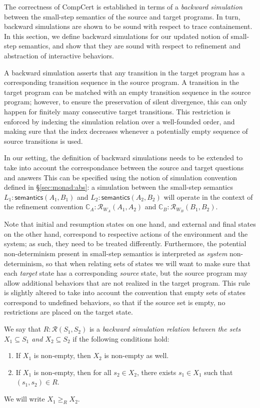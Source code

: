 \documentclass[acmsmall,timestamp,review]{acmart}
\newcommand{\kw}[1]{\ensuremath{ \mathsf{#1} }}
\begin{document}
The correctness of CompCert is established in terms of
a \emph{backward simulation}
between the small-step semantics of the source and target programs.
In turn, backward simulations
are shown to be sound with respect to trace containement.
In this section,
we define backward simulations for our updated notion
of small-step semantics,
and show that they are sound with respect to
refinement and abstraction of interactive behaviors.

A backward simulation asserts that any transition in the target program
has a corresponding transition sequence in the source program.
A transition in the target program can be matched with
an empty transition sequence in the source program;
however, to ensure the preservation of silent divergence,
this can only happen for finitely many consecutive target transitions.
This restriction is enforced by indexing the simulation relation
over a well-founded order,
and making sure that the index decreases
whenever a potentially empty sequence of source transitions is used.

In our setting,
the definition of backward simulations needs to be extended
to take into account the correspondance between
the source and target questions and answers
This can be specified using the notion of simulation convention
defined in \S\ref{sec:monad:abs}:
a simulation between the small-step semantics
$L_1 : \kw{semantics}(A_1, B_1)$ and
$L_2 : \kw{semantics}(A_2, B_2)$ will
operate in the context of the refinement convention
$\mathbb{C}_A : \mathcal{R}_{W_A}(A_1, A_2)$ and
$\mathbb{C}_B : \mathcal{R}_{W_B}(B_1, B_2)$.

Note that initial and resumption states on one hand,
and external and final states on the other hand,
correspond to respective actions of the environment and the system;
as such, they need to be treated differently.
Furthermore,
the potential non-determinism present in small-step semantics
is interpreted as \emph{system} non-determinism,
so that when relating sets of states
we will want to make sure that
each \emph{target} state has a corresponding \emph{source} state,
but the source program may allow additional behaviors
that are not realized in the target program.
This rule is slightly altered to take into account the convention that
empty sets of states correspond to undefined behaviors,
so that if the source set is empty,
no restrictions are placed on the target state.

\begin{definition}
We say that $R : \mathcal{R}(S_1, S_2)$ is a
\emph{backward simulation relation
  between the sets $X_1 \subseteq S_1$ and  $X_2 \subseteq S_2$}
if the following conditions hold:
\begin{enumerate}
\item
  If $X_1$ is non-empty,
  then $X_2$ is non-empty as well.
\item
  If $X_1$ is non-empty,
  then for all $s_2 \in X_2$,
  there exists $s_1 \in X_1$
  such that $(s_1, s_2) \in R$.
\end{enumerate}
We will write $X_1 \ge_R X_2$.
\end{definition}
\end{document}
